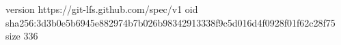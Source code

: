 version https://git-lfs.github.com/spec/v1
oid sha256:3d3b0e5b6945e882974b7b026b98342913338f9c5d016d4f0928f01f62c28f75
size 336
